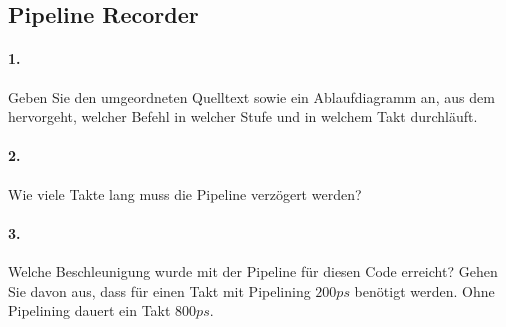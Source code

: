 \documentclass[paper=a4, fontsize=11pt]{scrartcl}
\numberwithin{equation}{section}
\numberwithin{figure}{section}
\numberwithin{table}{section}
\begin{document}
\subsection{Pipeline Recorder}

\paragraph{1.}
Geben Sie den umgeordneten Quelltext sowie ein Ablaufdiagramm an, aus dem hervorgeht, welcher Befehl in welcher Stufe und in welchem Takt durchläuft.

\paragraph{2.}
Wie viele Takte lang muss die Pipeline verzögert werden?

\paragraph{3.}
Welche Beschleunigung wurde mit der Pipeline für diesen Code erreicht? Gehen Sie davon aus, dass für einen Takt mit Pipelining $200 ps$ benötigt werden. Ohne Pipelining dauert ein Takt $800 ps$.

\end{document}
